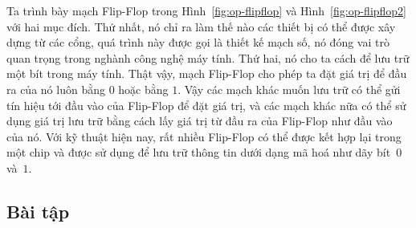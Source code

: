 Ta trình bày mạch Flip-Flop trong Hình~\ref{fig:op-flipflop} và Hình~\ref{fig:op-flipflop2}
với hai mục đích. Thứ nhất, nó chỉ ra làm thế nào các thiết bị có thể được xây dựng từ
các cổng, quá trình này được gọi là thiết kế mạch số, nó đóng vai trò quan trọng trong
nghành công nghệ máy tính. Thứ hai, nó cho ta cách để lưu trữ một bít trong máy tính. Thật
vậy, mạch Flip-Flop cho phép ta đặt giá trị để đầu ra của nó luôn bằng $0$ hoặc bằng
$1$. Vậy các mạch khác muốn lưu trữ có thể gửi tín hiệu tới đầu vào của Flip-Flop để đặt
giá trị, và các mạch khác nữa có thể sử dụng giá trị lưu trữ bằng cách lấy giá trị từ đầu
ra của Flip-Flop như đầu vào của nó. Với kỹ thuật hiện nay, rất nhiều Flip-Flop có thể
được kết hợp lại trong một chip và được sử dụng để lưu trữ thông tin dưới dạng mã hoá như
dãy bít~$0$ và~$1$.

\subsection*{Bài tập}
